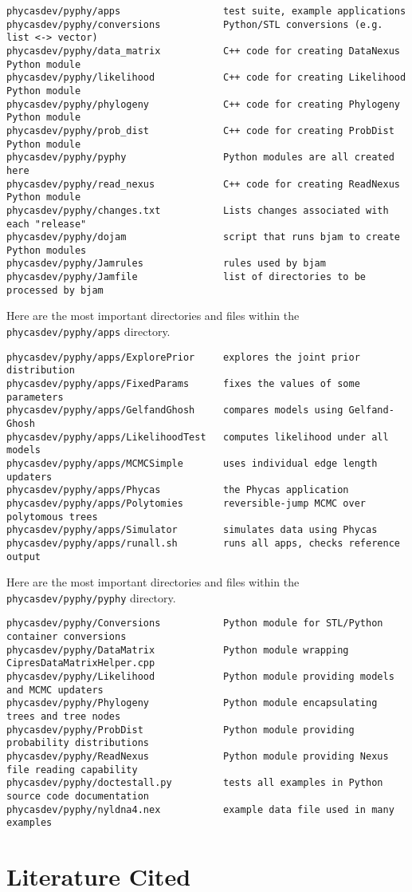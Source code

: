\documentclass[10pt]{article}
\begin{document}
\begin{verbatim}
phycasdev/pyphy/apps                  test suite, example applications
phycasdev/pyphy/conversions           Python/STL conversions (e.g. list <-> vector)
phycasdev/pyphy/data_matrix           C++ code for creating DataNexus Python module
phycasdev/pyphy/likelihood            C++ code for creating Likelihood Python module
phycasdev/pyphy/phylogeny             C++ code for creating Phylogeny Python module
phycasdev/pyphy/prob_dist             C++ code for creating ProbDist Python module
phycasdev/pyphy/pyphy                 Python modules are all created here
phycasdev/pyphy/read_nexus            C++ code for creating ReadNexus Python module
phycasdev/pyphy/changes.txt           Lists changes associated with each "release"
phycasdev/pyphy/dojam                 script that runs bjam to create Python modules
phycasdev/pyphy/Jamrules              rules used by bjam
phycasdev/pyphy/Jamfile               list of directories to be processed by bjam
\end{verbatim}

Here are the most important directories and files within the {\tt phycasdev/pyphy/apps} directory.

\begin{verbatim}
phycasdev/pyphy/apps/ExplorePrior     explores the joint prior distribution
phycasdev/pyphy/apps/FixedParams      fixes the values of some parameters
phycasdev/pyphy/apps/GelfandGhosh     compares models using Gelfand-Ghosh
phycasdev/pyphy/apps/LikelihoodTest   computes likelihood under all models
phycasdev/pyphy/apps/MCMCSimple       uses individual edge length updaters
phycasdev/pyphy/apps/Phycas           the Phycas application
phycasdev/pyphy/apps/Polytomies       reversible-jump MCMC over polytomous trees
phycasdev/pyphy/apps/Simulator        simulates data using Phycas
phycasdev/pyphy/apps/runall.sh        runs all apps, checks reference output
\end{verbatim}

Here are the most important directories and files within the {\tt phycasdev/pyphy/pyphy} directory.

\begin{verbatim}
phycasdev/pyphy/Conversions           Python module for STL/Python container conversions
phycasdev/pyphy/DataMatrix            Python module wrapping CipresDataMatrixHelper.cpp 
phycasdev/pyphy/Likelihood            Python module providing models and MCMC updaters
phycasdev/pyphy/Phylogeny             Python module encapsulating trees and tree nodes
phycasdev/pyphy/ProbDist              Python module providing probability distributions
phycasdev/pyphy/ReadNexus             Python module providing Nexus file reading capability
phycasdev/pyphy/doctestall.py         tests all examples in Python source code documentation
phycasdev/pyphy/nyldna4.nex           example data file used in many examples
\end{verbatim}

%
%

\section{Literature Cited}
\renewcommand{\bibsection}{}

\end{document}
